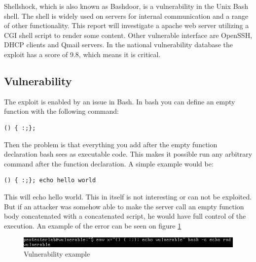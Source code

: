 Shellshock, which is also known as Bashdoor, is a vulnerability in the Unix Bash shell. The shell is widely used on servers for internal communication and a range of other functionality. This report will investigate a apache web server utilizing a CGI\cite{CGI} shell script to render some content. Other vulnerable interface are OpenSSH, DHCP clients and Qmail servers\cite{opsxcq}. In the national vulnerability database the exploit has a score of 9.8, which means it is critical\cite{CVE-2014-6271}.  

\subsection*{Vulnerability}
The exploit is enabled by an issue in Bash. In bash you can define an empty function with the following command: 

\begin{lstlisting}
() { :;};
\end{lstlisting}  

Then the problem is that everything you add after the empty function declaration bash sees as executable code. This makes it possible run any arbitrary command after the function declaration. A simple example would be: 

\begin{lstlisting}
() { :;}; echo hello world
\end{lstlisting} 

This will echo hello world. This in itself is not interesting or can not be exploited. But if an attacker was somehow able to make the server call an empty function  body concatenated with a concatenated script, he would have full control of the execution. An example of the error can be seen on figure \ref{fig:vulnerability-echo-vulnerable}

\begin{figure} [ht]
    \centering
    \includegraphics[width=\columnwidth]{../pictures/vulnerability-echo-vulnerable.png}
    \caption{Vulnerability example}
    \label{fig:vulnerability-echo-vulnerable}
\end{figure}

